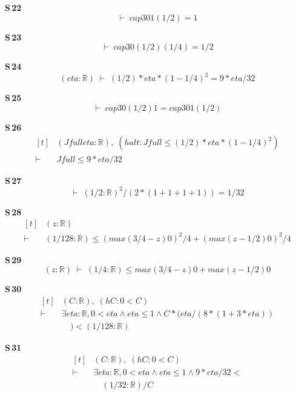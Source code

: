 \noindent\textbf{S\,22}\quad{}
{\footnotesize\[ \vdash\; \mathit{cap3} 0 1 (1/2) = 1 \]}

\noindent\textbf{S\,23}\quad{}
{\footnotesize\[ \vdash\; \mathit{cap3} 0 (1/2) (1/4) = 1/2 \]}

\noindent\textbf{S\,24}\quad{}
{\footnotesize\[ (\mathit{eta} : \mathbb{R} ) \;\vdash\; (1/2) * \mathit{eta} * (1 - 1/4) ^{2} = 9 * \mathit{eta} / 32 \]}

\noindent\textbf{S\,25}\quad{}
{\footnotesize\[ \vdash\; \mathit{cap3} 0 (1/2) 1 = \mathit{cap3} 0 1 (1/2) \]}

\noindent\textbf{S\,26}\quad{}
{\footnotesize\[ \begin{aligned}[t]
&(\mathit{Jfull} \mathit{eta} : \mathbb{R} ),\; (\mathit{halt} : \mathit{Jfull} \leq (1/2) * \mathit{eta} * (1 - 1/4) ^{2})\\
\vdash\;&\mathit{Jfull} \leq 9 * \mathit{eta} / 32
\end{aligned} \]}

\noindent\textbf{S\,27}\quad{}
{\footnotesize\[ \vdash\; (1/2 : \mathbb{R} ) ^{2} / (2 * (1 + 1 + 1 + 1)) = 1 / 32 \]}

\noindent\textbf{S\,28}\quad{}
{\footnotesize\[ \begin{aligned}[t]
&(\mathit{z} : \mathbb{R} )\\
\vdash\;&(1/128 : \mathbb{R} ) \leq (\mathit{max} (3/4 - \mathit{z}) 0) ^{2} / 4 + (\mathit{max} (\mathit{z} - 1/2) 0) ^{2} / 4
\end{aligned} \]}

\noindent\textbf{S\,29}\quad{}
{\footnotesize\[ (\mathit{z} : \mathbb{R} ) \;\vdash\; (1/4 : \mathbb{R} ) \leq \mathit{max} (3/4 - \mathit{z}) 0 + \mathit{max} (\mathit{z} - 1/2) 0 \]}

\noindent\textbf{S\,30}\quad{}
{\footnotesize\[ \begin{aligned}[t]
&(\mathit{C} : \mathbb{R} ),\; (\mathit{hC} : 0 < \mathit{C})\\
\vdash\;&\exists \mathit{eta} : \mathbb{R} , 0 < \mathit{eta} \wedge \mathit{eta} \leq 1 \wedge \mathit{C} * (\mathit{eta} / (8 * (1 + 3 * \mathit{eta}))\\
&\quad ) < (1 / 128 : \mathbb{R} )
\end{aligned} \]}

\noindent\textbf{S\,31}\quad{}
{\footnotesize\[ \begin{aligned}[t]
&(\mathit{C} : \mathbb{R} ),\; (\mathit{hC} : 0 < \mathit{C})\\
\vdash\;&\exists \mathit{eta} : \mathbb{R} , 0 < \mathit{eta} \wedge \mathit{eta} \leq 1 \wedge 9 * \mathit{eta} / 32 <\\
&\quad (1 / 32 : \mathbb{R} ) / \mathit{C}
\end{aligned} \]}


